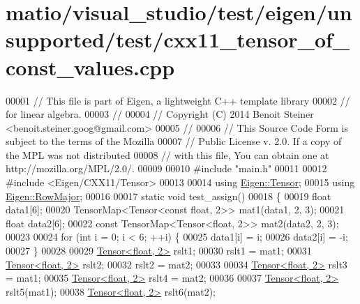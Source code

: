 \hypertarget{matio_2visual__studio_2test_2eigen_2unsupported_2test_2cxx11__tensor__of__const__values_8cpp_source}{}\section{matio/visual\+\_\+studio/test/eigen/unsupported/test/cxx11\+\_\+tensor\+\_\+of\+\_\+const\+\_\+values.cpp}
\label{matio_2visual__studio_2test_2eigen_2unsupported_2test_2cxx11__tensor__of__const__values_8cpp_source}

\begin{DoxyCode}
00001 \textcolor{comment}{// This file is part of Eigen, a lightweight C++ template library}
00002 \textcolor{comment}{// for linear algebra.}
00003 \textcolor{comment}{//}
00004 \textcolor{comment}{// Copyright (C) 2014 Benoit Steiner <benoit.steiner.goog@gmail.com>}
00005 \textcolor{comment}{//}
00006 \textcolor{comment}{// This Source Code Form is subject to the terms of the Mozilla}
00007 \textcolor{comment}{// Public License v. 2.0. If a copy of the MPL was not distributed}
00008 \textcolor{comment}{// with this file, You can obtain one at http://mozilla.org/MPL/2.0/.}
00009 
00010 \textcolor{preprocessor}{#include "main.h"}
00011 
00012 \textcolor{preprocessor}{#include <Eigen/CXX11/Tensor>}
00013 
00014 \textcolor{keyword}{using} \hyperlink{class_eigen_1_1_tensor}{Eigen::Tensor};
00015 \textcolor{keyword}{using} \hyperlink{group__enums_ggaacded1a18ae58b0f554751f6cdf9eb13acfcde9cd8677c5f7caf6bd603666aae3}{Eigen::RowMajor};
00016 
00017 \textcolor{keyword}{static} \textcolor{keywordtype}{void} test\_assign()
00018 \{
00019   \textcolor{keywordtype}{float} data1[6];
00020   TensorMap<Tensor<const float, 2>> mat1(data1, 2, 3);
00021   \textcolor{keywordtype}{float} data2[6];
00022   \textcolor{keyword}{const} TensorMap<Tensor<float, 2>> mat2(data2, 2, 3);
00023 
00024   \textcolor{keywordflow}{for} (\textcolor{keywordtype}{int} i = 0; i < 6; ++i) \{
00025     data1[i] = i;
00026     data2[i] = -i;
00027   \}
00028 
00029   \hyperlink{class_eigen_1_1_tensor}{Tensor<float, 2>} rslt1;
00030   rslt1 = mat1;
00031   \hyperlink{class_eigen_1_1_tensor}{Tensor<float, 2>} rslt2;
00032   rslt2 = mat2;
00033 
00034   \hyperlink{class_eigen_1_1_tensor}{Tensor<float, 2>} rslt3 = mat1;
00035   \hyperlink{class_eigen_1_1_tensor}{Tensor<float, 2>} rslt4 = mat2;
00036 
00037   \hyperlink{class_eigen_1_1_tensor}{Tensor<float, 2>} rslt5(mat1);
00038   \hyperlink{class_eigen_1_1_tensor}{Tensor<float, 2>} rslt6(mat2);

\end{DoxyCode}

